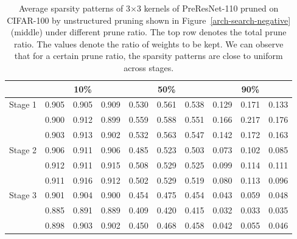 \setlength{\tabcolsep}{5pt}
\renewcommand{\arraystretch}{1.2}
\begin{table}[!htbp]
\centering
\small
\begin{tabular}{c|ccc|ccc|ccc}
\hline
                         & \multicolumn{3}{c|}{10\%} & \multicolumn{3}{c|}{50\%} & \multicolumn{3}{c}{90\%} \\ \hline
\multirow{3}{*}{Stage 1} & 0.905   & 0.905  & 0.909  & 0.530   & 0.561  & 0.538  & 0.129  & 0.171  & 0.133  \\
                         & 0.900   & 0.912  & 0.899  & 0.559   & 0.588  & 0.551  & 0.166  & 0.217  & 0.176  \\
                         & 0.903   & 0.913  & 0.902  & 0.532   & 0.563  & 0.547  & 0.142  & 0.172  & 0.163  \\ \hline
\multirow{3}{*}{Stage 2} & 0.906   & 0.911  & 0.906  & 0.485   & 0.523  & 0.503  & 0.073  & 0.102  & 0.085  \\
                         & 0.912   & 0.911  & 0.915  & 0.508   & 0.529  & 0.525  & 0.099  & 0.114  & 0.111  \\
                         & 0.911   & 0.916  & 0.912  & 0.502   & 0.529  & 0.519  & 0.080  & 0.113  & 0.096  \\ \hline
\multirow{3}{*}{Stage 3} & 0.901   & 0.904  & 0.900  & 0.454   & 0.475  & 0.454  & 0.043  & 0.059  & 0.048  \\
                         & 0.885   & 0.891  & 0.889  & 0.409   & 0.420  & 0.415  & 0.032  & 0.033  & 0.035  \\
                         & 0.898   & 0.903  & 0.902  & 0.450   & 0.468  & 0.458  & 0.042  & 0.055  & 0.046  \\ \hline
\end{tabular}
  \caption{
      Average sparsity patterns of 3$\times$3 kernels of PreResNet-110 pruned on CIFAR-100 by unstructured pruning shown in Figure~\ref{arch-search-negative} (middle) under different prune ratio. The top row denotes the total prune ratio. The values denote the ratio of weights to be kept. We can observe that for a certain prune ratio, the sparsity patterns are close to uniform across stages.}
\label{sparsity-6}
\end{table}


